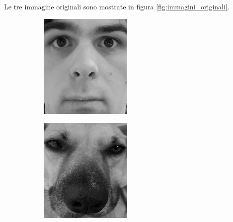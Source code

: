 \documentclass{article}
\begin{document}
Le tre immagine originali sono mostrate in figura \ref{fig:immagini_originali}.

\begin{figure}[H]
    \centering
    \begin{subfigure}[b]{0.29\textwidth}
        \centering
        \includegraphics[width=\textwidth]{../liam_face2.png}
    \end{subfigure}
    \begin{subfigure}[b]{0.29\textwidth}
        \centering
        \includegraphics[width=\textwidth]{../lady_face.png}

\end{subfigure}
\end{figure}
\end{document}
